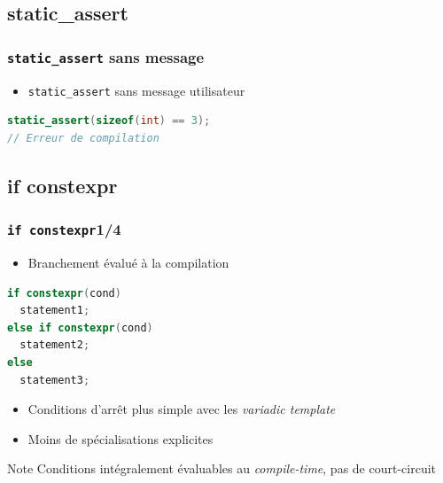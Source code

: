 \documentclass[C++.tex]{subfiles}
\begin{document}
\subsection*{static\_assert}
\begin{frame}[fragile]
	\frametitle{\lstinline|static_assert| sans message}
	\begin{itemize}
		\item \lstinline|static_assert| sans message utilisateur
	\end{itemize}

	\begin{lstlisting}[language=C++]
static_assert(sizeof(int) == 3);
// Erreur de compilation\end{lstlisting}
\end{frame}

\subsection*{if constexpr}
\begin{frame}[fragile]
	\frametitle{\lstinline|if constexpr|\titlehfill{}1/4}
	\begin{itemize}
		\item Branchement évalué à la compilation
	\end{itemize}

	\begin{lstlisting}[language=C++]
if constexpr(cond)
  statement1;
else if constexpr(cond)
  statement2;
else
  statement3;\end{lstlisting}

	\begin{itemize}
		\item Conditions d'arrêt plus simple avec les \textit{variadic template}
		\item Moins de spécialisations explicites

	\end{itemize}

	\begin{block}{Note}
		Conditions intégralement évaluables au \textit{compile-time}, pas de court-circuit

	\end{block}
\end{frame}
\end{document}
